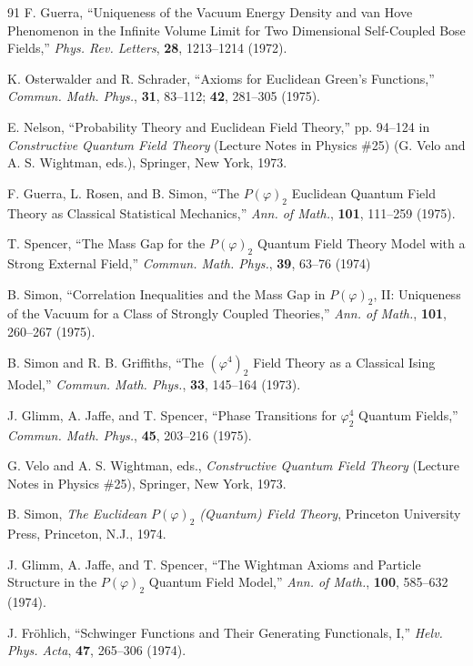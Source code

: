 \begin{thebibliography}{91}
F. Guerra, ``Uniqueness of the Vacuum Energy Density and van Hove Phenomenon
in the Infinite Volume Limit for Two Dimensional Self-Coupled Bose Fields,''
\emph{Phys. Rev. Letters}, \textbf{28}, 1213--1214 (1972).

K. Osterwalder and R. Schrader, ``Axioms for Euclidean Green's Functions,''
\emph{Commun. Math. Phys.}, \textbf{31}, 83--112; \textbf{42}, 281--305
(1975).

E. Nelson, ``Probability Theory and Euclidean Field Theory,'' pp. 94--124 in
\emph{Constructive Quantum Field Theory} (Lecture Notes in Physics \#25)
(G. Velo and A. S. Wightman, eds.), Springer, New York, 1973.

F. Guerra, L. Rosen, and B. Simon, ``The $P(\varphi)_2$ Euclidean Quantum
Field Theory as Classical Statistical Mechanics,'' \emph{Ann. of Math.},
\textbf{101}, 111--259 (1975).

T. Spencer, ``The Mass Gap for the $P(\varphi)_2$ Quantum Field Theory Model
with a Strong External Field,'' \emph{Commun. Math. Phys.}, \textbf{39},
63--76 (1974)

B. Simon, ``Correlation Inequalities and the Mass Gap in $P(\varphi)_2$, II:
Uniqueness of the Vacuum for a Class of Strongly Coupled Theories,''
\emph{Ann. of Math.}, \textbf{101}, 260--267 (1975).

B. Simon and R. B. Griffiths, ``The $(\varphi^4)_2$ Field Theory as a
Classical Ising Model,'' \emph{Commun. Math. Phys.}, \textbf{33}, 145--164
(1973).

J. Glimm, A. Jaffe, and T. Spencer, ``Phase Transitions for $\varphi_2^4$
Quantum Fields,'' \emph{Commun. Math. Phys.}, \textbf{45}, 203--216 (1975).

G. Velo and A. S. Wightman, eds., \emph{Constructive Quantum Field Theory}
(Lecture Notes in Physics \#25), Springer, New York, 1973.

B. Simon, \emph{The Euclidean $P(\varphi)_2$ (Quantum) Field Theory},
Princeton University Press, Princeton, N.J., 1974.

J. Glimm, A. Jaffe, and T. Spencer, ``The Wightman Axioms and Particle
Structure in the $P(\varphi)_2$ Quantum Field Model,'' \emph{Ann. of Math.},
\textbf{100}, 585--632 (1974).

J. Fr\"ohlich, ``Schwinger Functions and Their Generating Functionals, I,''
\emph{Helv. Phys. Acta}, \textbf{47}, 265--306 (1974).


\end{thebibliography}
